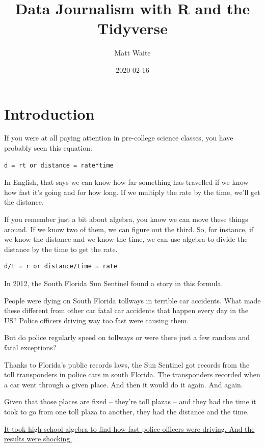 \documentclass[]{book}
\title{Data Journalism with R and the Tidyverse}
\author{Matt Waite}
\date{2020-02-16}
\begin{document}
\maketitle

{
\setcounter{tocdepth}{1}
\tableofcontents
}
\hypertarget{introduction}{%
\chapter{Introduction}\label{introduction}}

If you were at all paying attention in pre-college science classes, you have probably seen this equation:

\begin{verbatim}
d = rt or distance = rate*time
\end{verbatim}

In English, that says we can know how far something has travelled if we know how fast it's going and for how long. If we multiply the rate by the time, we'll get the distance.

If you remember just a bit about algebra, you know we can move these things around. If we know two of them, we can figure out the third. So, for instance, if we know the distance and we know the time, we can use algebra to divide the distance by the time to get the rate.

\begin{verbatim}
d/t = r or distance/time = rate
\end{verbatim}

In 2012, the South Florida Sun Sentinel found a story in this formula.

People were dying on South Florida tollways in terrible car accidents. What made these different from other car fatal car accidents that happen every day in the US? Police officers driving way too fast were causing them.

But do police regularly speed on tollways or were there just a few random and fatal exceptions?

Thanks to Florida's public records laws, the Sun Sentinel got records from the toll transponders in police cars in south Florida. The transponders recorded when a car went through a given place. And then it would do it again. And again.

Given that those places are fixed -- they're toll plazas -- and they had the time it took to go from one toll plaza to another, they had the distance and the time.

\href{http://www.sun-sentinel.com/news/local/speeding-cops/fl-speeding-cops-20120211,0,3706919.story}{It took high school algebra to find how fast police officers were driving. And the results were shocking.}
\end{document}
